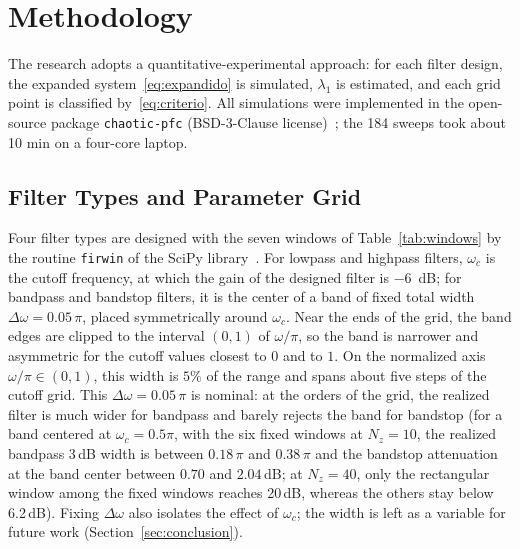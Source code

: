 \documentclass[journal]{IEEEtran}
\begin{document}
\section{Methodology}\label{sec:method}
The research adopts a quantitative-experimental approach: for each filter
design, the expanded system~\eqref{eq:expandido} is simulated, $\lambda_1$ is
estimated, and each grid point is classified by~\eqref{eq:criterio}. All simulations were implemented in the open-source package
\texttt{chaotic-pfc} (BSD-3-Clause license)~\cite{chaoticPFC2026}; the 184
sweeps took about 10 min on a four-core laptop.

\subsection{Filter Types and Parameter Grid}\label{sub:grid}
Four filter types are designed with the seven windows of
Table~\ref{tab:windows} by the routine \texttt{firwin} of the SciPy
library~\cite{Virtanen2020}.
For lowpass and highpass filters, $\omega_c$ is the cutoff frequency, at which
the gain of the designed filter is $-6$~dB; for bandpass and bandstop filters,
it is the center of a
band of fixed total width $\Delta\omega=0.05\,\pi$, placed symmetrically around
$\omega_c$. Near the ends of the grid, the band edges are clipped to the interval
$(0,1)$ of $\omega/\pi$, so the band is narrower and asymmetric for the cutoff
values closest to $0$ and to $1$. On the normalized axis $\omega/\pi\in(0,1)$, this width is $5\%$
of the range and spans about five steps of the cutoff grid. This
$\Delta\omega=0.05\,\pi$ is nominal: at the orders of the grid, the realized
filter is much wider for bandpass and barely rejects the band for bandstop
(for a band centered at $\omega_c=0.5\pi$, with the six fixed windows at
$N_z=10$, the realized bandpass 3\,dB width is between $0.18\,\pi$ and
$0.38\,\pi$ and the bandstop attenuation at the band center between $0.70$ and
$2.04$\,dB; at $N_z=40$, only the rectangular window among the fixed windows
reaches 20\,dB, whereas the others stay below 6.2\,dB). Fixing $\Delta\omega$ also isolates
the effect of $\omega_c$; the width is left as a variable for future work
(Section~\ref{sec:conclusion}).
\end{document}
